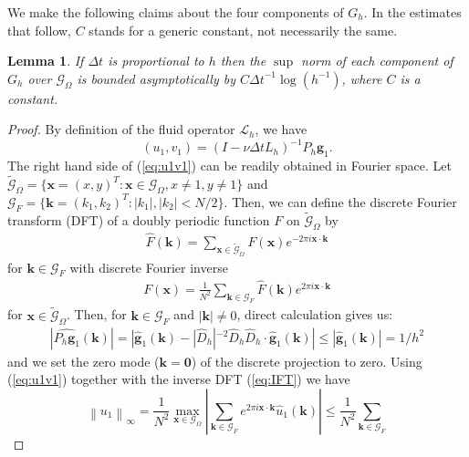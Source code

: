 \documentclass[preprint,12pt]{elsarticle}
\newcommand{\norm}[1]{\left\lVert#1\right\rVert}
\newtheorem{lemma}{Lemma}[section]
\begin{document}
We make the following claims about the four components of $G_h$. In the estimates that follow, $C$ stands for a generic
constant, not necessarily the same. 
\begin{lemma}
\label{lemma:Gh}
If $\Delta t$ is proportional to $h$ then the $\sup$ norm of each component of $G_h$ over $\mathcal{G}_\Omega$ is bounded asymptotically by $C {\Delta t}^{-1}\log(h^{-1})$, where $C$ is a constant. 
\end{lemma}
\begin{proof}
By definition of the fluid operator $\mathcal{L}_h$, we have 
\begin{equation}
(u_1,v_1) = (I -\nu\Delta t L_h)^{-1}  P_h \mathbf{g}_1.\label{eq:u1v1}
\end{equation}
The right hand side of (\ref{eq:u1v1}) can be readily obtained in Fourier space.  Let 
$\tilde{\mathcal{G}}_\Omega =\{ \mathbf{x}=(x,y)^T : \mathbf{x} \in \mathcal{G}_\Omega, x \neq 1, y \neq 1\}$
and $\mathcal{G}_F =\{ \mathbf{k}=(k_1,k_2)^T :       |k_1|,|k_2| <N/2\}$. Then, we can define the 
 discrete Fourier transform (DFT) of a doubly periodic function $F$  on $\tilde{\mathcal{G}}_\Omega$ by
\begin{align}
\widehat{F}(\mathbf{k}) =  \sum_{\mathbf{x} \in \tilde{\mathcal{G}}_\Omega} F(\mathbf{x}) e^{-2\pi i \mathbf{x}\cdot \mathbf{k}}
\end{align}
for $\mathbf{k} \in \mathcal{G}_F$ with discrete Fourier inverse
\begin{align}
F(\mathbf{x}) =\frac{1}{N^2} \sum_{\mathbf{k} \in \mathcal{G}_F} \widehat{F}(\mathbf{k}) e^{2 \pi i \mathbf{x}\cdot \mathbf{k}}
\label{eq:IFT}
\end{align}
for $\mathbf{x} \in \tilde{\mathcal{G}}_\Omega $. Then, for $\mathbf{k} \in \mathcal{G}_F$  and $|\mathbf{k}| \ne 0$, 
direct calculation gives us:
\begin{align}
|\widehat{P_h \mathbf{g}_1}(\mathbf{k})| = |\hat{\mathbf{g}}_1(\mathbf{k})-|\widehat{D}_h|^{-2}\widehat{D}_h\widehat{D}_h\cdot\hat{\mathbf{g}}_1(\mathbf{k})| \leq |\hat{\mathbf{g}}_1(\mathbf{k})| = 1/h^2
\end{align}
and we set  the zero mode ($\mathbf{k}=\mathbf{0}$) of the discrete projection to zero. 
Using (\ref{eq:u1v1}) together with the inverse DFT (\ref{eq:IFT}) we have
\begin{equation}
\norm{u_1}_\infty =
\frac{1}{N^2}\max_{\mathbf{x}\in\mathcal{G}_\Omega}
\left|\sum_{\mathbf{k}\in\mathcal{G}_F}
e^{2\pi i\mathbf{x}\cdot\mathbf{k}}
\hat{u}_1(\mathbf{k})\right|
\leq
\frac{1}{N^2}\sum_{\mathbf{k}\in\mathcal{G}_F}

\end{equation}
\end{proof}
\end{document}
